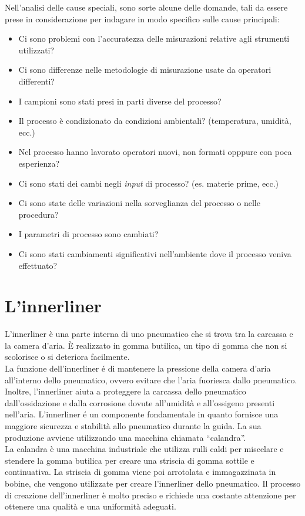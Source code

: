 Nell'analisi delle cause speciali, sono sorte alcune delle domande, tali da essere prese in considerazione per indagare in modo specifico sulle cause principali:
\begin{itemize}
  \item Ci sono problemi con l'accuratezza delle misurazioni relative agli strumenti utilizzati?
  \item Ci sono differenze nelle metodologie di misurazione usate da operatori differenti?
  \item I campioni sono stati presi in parti diverse del processo?
  \item Il processo è condizionato da condizioni ambientali? (temperatura, umidità, ecc.)
  \item Nel processo hanno lavorato operatori nuovi, non formati opppure con poca esperienza?
  \item Ci sono stati dei cambi negli \textit{input} di processo? (es. materie prime, ecc.)
  \item Ci sono state delle variazioni nella sorveglianza del processo o nelle procedura?
  \item I parametri di processo sono cambiati?
  \item Ci sono stati cambiamenti significativi nell'ambiente dove il processo veniva effettuato?
  \end{itemize}





\label{L'innerliner}
\section{L'innerliner}
L'innerliner è una parte interna di uno pneumatico che si trova tra la carcassa e la camera d'aria. È realizzato in gomma butilica, un tipo di gomma che non si scolorisce o si deteriora facilmente. \\
La funzione dell'innerliner é di mantenere la pressione della camera d'aria all'interno dello pneumatico, ovvero evitare che l'aria fuoriesca dallo pneumatico. 
\cite{Innerliner} \\
Inoltre, l'innerliner aiuta a proteggere la carcassa dello pneumatico dall'ossidazione e dalla corrosione dovute all'umidità e all'ossigeno presenti nell'aria. 
L'innerliner é un componente fondamentale in quanto fornisce una maggiore sicurezza e stabilità allo pneumatico durante la guida. 
\cite{pneurama}
La sua produzione avviene utilizzando una macchina chiamata ``calandra''. \\
La calandra è una macchina industriale che utilizza rulli caldi per miscelare e stendere la gomma butilica per creare una striscia di gomma sottile e continuativa. 
La striscia di gomma viene poi arrotolata e immagazzinata in bobine, che vengono utilizzate per creare l'innerliner dello pneumatico. Il processo di creazione dell'innerliner è molto preciso e richiede una costante attenzione per ottenere una qualità e una uniformità adeguati.
\cite{pneurama}

